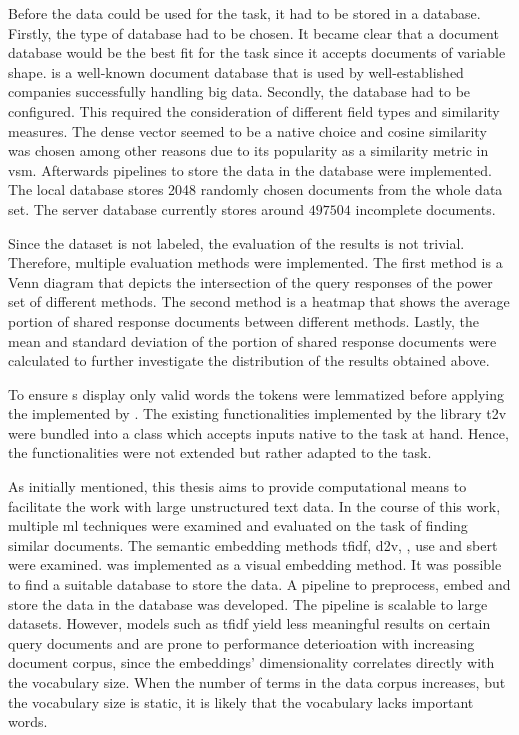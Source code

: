 Before the data could be used for the task, it had to be stored in a database.
Firstly, the type of database had to be chosen.
It became clear that a document database would be the best fit for the task 
since it accepts documents of variable shape.
\databaseName{} is a well-known document database that is used by 
well-established companies successfully handling big data.
Secondly, the database had to be configured.
This required the consideration of different field types and similarity measures.
The dense vector seemed to be a native choice and cosine similarity was chosen 
among other reasons due to its popularity as a similarity metric in \ac{vsm}.
Afterwards pipelines to store the data in the database were implemented.
The local database stores 2048 randomly chosen documents from the whole data set.
The server database currently stores around $497504$ incomplete documents.

Since the dataset is not labeled, the evaluation of the results is not trivial.
Therefore, multiple evaluation methods were implemented.
The first method is a Venn diagram that depicts the intersection of the query responses of the power set of different methods.
The second method is a heatmap that shows the average portion of shared response documents between different methods.
Lastly, the mean and standard deviation of the portion of shared response documents were calculated 
to further investigate the distribution of the results obtained above.

To ensure \wordcloud{}s display only valid words the tokens were lemmatized before applying the \wordcloud{} implemented by \citeauthor{wordcloud-dev}. 
The existing functionalities implemented by the library \ac{t2v} were bundled into a class 
which accepts inputs native to the task at hand.
Hence, the functionalities were not extended but rather adapted to the task.  


As initially mentioned, this thesis aims to provide computational means to facilitate the work with large unstructured text data.
In the course of this work, multiple \ac{ml} techniques were examined and evaluated on the task of finding similar documents.
The semantic embedding methods \ac{tfidf}, \ac{d2v}, \infersent{}, \ac{use} and \ac{sbert} were examined.
\eigendocs{} was implemented as a visual embedding method.
It was possible to find a suitable database to store the data.
A pipeline to preprocess, embed and store the data in the database was developed.
The pipeline is scalable to large datasets.
However, models such as \ac{tfidf} yield less meaningful results on certain query documents and 
are prone to performance deterioation with increasing document corpus, since the embeddings' 
dimensionality correlates directly with the vocabulary size.
When the number of terms in the data corpus increases, but the vocabulary size is static, 
it is likely that the vocabulary lacks important words. 

